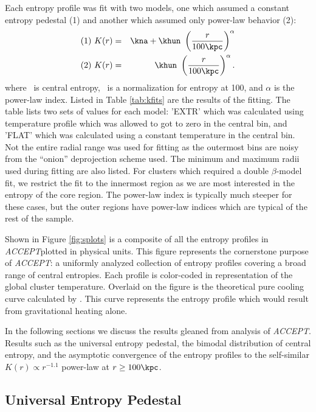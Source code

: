 \documentclass[12pt, preprint]{aastex}
\newcommand{\accept}{\textit{ACCEPT}}
\begin{document}
{Each entropy profile was fit with two models, one which assumed a
constant entropy pedestal (1) and another which assumed only power-law
behavior (2):
\begin{eqnarray}
(1)~K(r) &=& \kna + \khun\ \left(\frac{r}{100 \kpc}\right)^{\alpha}\nonumber \\
(2)~K(r) &=& \khun\ \left(\frac{r}{100 \kpc}\right)^{\alpha}.\nonumber
\end{eqnarray}
where \kna\ is central entropy, \khun\ is a normalization for entropy
at 100\kpc, and $\alpha$ is the power-law index. Listed in Table
\ref{tab:kfits} are the results of the fitting. The table lists two
sets of values for each model: 'EXTR' which was calculated using
temperature profile which was allowed to got to zero in the central
bin, and 'FLAT' which was calculated using a constant temperature in
the central bin. Not the entire radial range was used for fitting as
the outermost bins are noisy from the ``onion'' deprojection scheme
used. The minimum and maximum radii used during fitting are also
listed. For clusters which required a double $\beta$-model fit, we
restrict the fit to the innermost region as we are most
interested in the entropy of the core region. The power-law index is
typically much steeper for these cases, but the outer regions have
power-law indices which are typical of the rest of the sample.

Shown in Figure \ref{fig:splots} is a composite of all the entropy
profiles in \accept plotted in physical units. This figure represents
the cornerstone purpose of \accept: a uniformly analyzed collection of
entropy profiles covering a broad range of central entropies. Each
profile is color-coded in representation of the global cluster
temperature. Overlaid on the figure is the theoretical pure cooling
curve calculated by \cite{2002ApJ...576..601V}. This curve represents
the entropy profile which would result from gravitational heating
alone.

In the following sections we discuss the results gleaned from analysis
of \accept. Results such as the universal entropy pedestal, the
bimodal distribution of central entropy, and the asymptotic
convergence of the entropy profiles to the self-similar $K(r) \propto
r^{-1.1}$ power-law at $r \geq 100\kpc$.

\subsection{Universal Entropy Pedestal}
\label{sec:uped}

}
\end{document}
